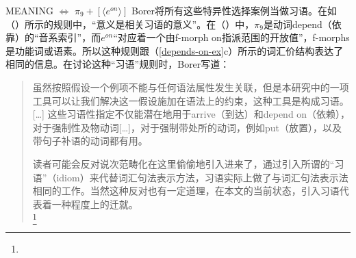 \begin{exe}
\begin{xlist}[iv.]
\begin{exe}
\begin{xlist}[iv.]
\ea
MEANING $\Leftrightarrow$ $\pi_9 + [ \langle e^{on} \rangle ]$  
\z
Borer将所有这些特异性选择案例当做习语。在如（）所示的规则中，“意义是相关习语的意义”\citep[Vol.\ II, p.\,27]{Borer2005a-u}。在（）中，$\pi_9$是动词depend（依靠）的“音系索引”，而$e^{on}$“对应着一个由f-morph on指派范围的开放值”\citep[Vol.\ II, p.\,29]{Borer2005a-u}，f-morphs是功能词或语素。所以这种规则跟（\ref{depends-on-ex}c）所示的词汇价结构表达了相同的信息。在讨论这种“习语”规则时，Borer写道：

\begin{quote}
虽然按照假设一个例项不能与任何语法属性发生关联，但是本研究中的一项工具可以让我们解决这一假设施加在语法上的约束，这种工具是构成习语。 [\ldots] 这些习语性指定不仅能潜在地用于arrive（到达）和depend on（依赖），对于强制性及物动词[\ldots]，对于强制带处所的动词，例如put（放置），以及带句子补语的动词都有用。

读者可能会反对说次范畴化在这里偷偷地引入进来了，通过引入所谓的“习语”（idiom）来代替词汇句法表示方法，习语实际上做了与词汇句法表示法相同的工作。当然这种反对也有一定道理，在本文的当前状态，引入习语代表着一种程度上的迁就。
  \\ \citep[Vol. II, p.\,354--355]{Borer2005a-u}\footnote{%

}
\end{quote}
\end{xlist}
\end{exe}
\end{xlist}
\end{exe}
